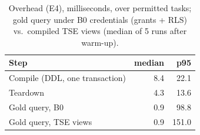 \begin{table}[t]\centering\caption{Overhead (E4), milliseconds, over permitted tasks; gold query under B0 credentials (grants + RLS) vs.\ compiled TSE views (median of 5 runs after warm-up).}\label{tab:e4}
\footnotesize\begin{tabular}{lrr}\hline\textbf{Step} & \textbf{median} & \textbf{p95} \\\hline
Compile (DDL, one transaction) & 8.4 & 22.1 \\
Teardown & 4.3 & 13.6 \\
Gold query, B0 & 0.9 & 98.8 \\
Gold query, TSE views & 0.9 & 151.0 \\
\hline\end{tabular}\end{table}
